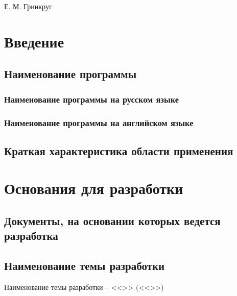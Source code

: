 \documentclass[a4paper,12pt,reqno]{article}
\begin{document}
	
	
	
	
	{Е. М. Гринкруг}
	
	\firstPage
						\newpage
	\secondPage
						\newpage
	\thirdPage
						\newpage
	\section{Введение}
	\subsection{Наименование программы}
	\subsubsection{Наименование программы на русском языке}
	
	\subsubsection{Наименование программы на английском языке}
	
	\subsection{Краткая характеристика области применения}
	
	\newpage
	\section{Основания для разработки}
	\subsection{Документы, на основании которых ведется разработка}
	
	
	
	
	\subsection{Наименование темы разработки}
	
	Наименование темы разработки – <<>> (<<>>)
\end{document}
